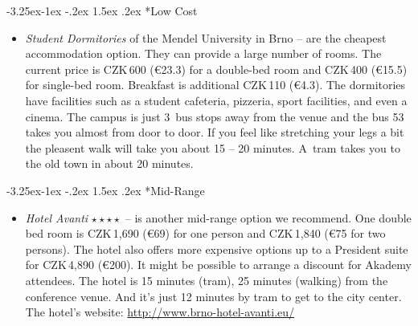 \documentclass[10pt,a4paper]{article}
\makeatletter
\renewcommand\subsection{%
\@startsection{subsection}{2}{\z@}%
              {-3.25ex\@plus -1ex \@minus -.2ex}%
              {1.5ex \@plus .2ex}%
              {\color{kdelight}\sffamily\Large\bfseries}}
\makeatother
\begin{document}
\subsection*{Low Cost}
\begin{itemize}
\item \emph{Student Dormitories} of the Mendel University in Brno -- 
are the cheapest accommodation option. They can provide a
large number of rooms. The current price is CZK\,600 (\euro{23.3}) for a
double-bed room and CZK\,400 (\euro{15.5}) for single-bed room. Breakfast is additional
CZK\,110 (\euro{4.3}). The dormitories have facilities
such as a student cafeteria, pizzeria, sport facilities, and even a
cinema. The campus is just 3~bus stops away from the venue and the bus
53 takes you almost from door to door. If you feel like stretching your
legs a bit the pleasent walk will take you about 15 -- 20 minutes. A~tram
takes you to the old town in about 20 minutes.
\end{itemize}

\begin{figure}[ht]
\begin{center}
\end{center}
\end{figure}

\subsection*{Mid-Range}
\begin{itemize}
\item \emph{Hotel Avanti} $\star\star\star\star{}$ -- is another mid-range option we recommend. One
double bed room is CZK\,1,690 (\euro{69}) for one person and CZK\,1,840
(\euro{75} for two persons). The hotel also offers more expensive
options up to a President suite for CZK\,4,890 (\euro{200}). It might be possible
to arrange a discount for Akademy attendees. The hotel is 15
minutes (tram), 25 minutes (walking) from the conference venue. And it's
just 12 minutes by tram to get to the city center. The hotel's website:
\url{http://www.brno-hotel-avanti.eu/}
\end{itemize}


\begin{figure}[ht]
\begin{center}
\end{center}
\end{figure}
\end{document}
